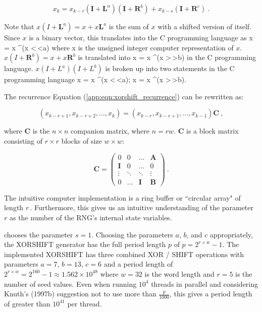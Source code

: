 \documentclass[a4paper]{scrartcl}
\begin{document}
\begin{equation*}
x_{k} = x_{k - r}  (\mathbf{I} + \mathbf{L}^a)(\mathbf{I} + \mathbf{R}^b) + x_{k - s} (\mathbf{I} + \mathbf{R}^c)~.
\end{equation*}

Note that $x(I + \mathbf{L}^a) = x + x \mathbf{L}^a$ is the sum of $x$ with a shifted version of itself.  Since $x$ is a binary vector, this translates into the C programming language as  \textsf{x = x \textasciicircum (x \textless\,\textless a) } where \textsf{x} is the unsigned integer computer representation of $x$. $x(I + \mathbf{R}^b) = x + x \mathbf{R}^b$ is translated into  \textsf{x = x \textasciicircum (x \textgreater\,\textgreater b) } in the C programming language. $x(I + L^a)(I + L^b)$ is broken up into two statements in the C programming language \textsf{x = x \textasciicircum (x \textless\,\textless a); x = x \textasciicircum (x \textgreater\,\textgreater b)}.

The recurrence Equation (\ref{app:eqn:xorshift_recurrence}) can be rewritten as:

\begin{equation*}
(x_{k - r + 1}, x_{k - r + 2}, \dots, x_k) = (x_{k - r}, x_{k - r + 1}, \dots, x_{k - 1}) \mathbf{C}~,
\end{equation*}

where $\mathbf{C}$ is the $n \times n$ companion matrix, where $n = r w$. $\mathbf{C}$ is a block matrix consisting of $r \times r$ blocks of size $w \times w$:

\begin{equation*}
\mathbf{C} = \left( \begin{array}{cccc}
0 & 0 & \dots & \mathbf{A} \\
\mathbf{I} & 0 & \dots & 0 \\
\vdots & \ddots & \ddots & \vdots \\
0 & \dots & \mathbf{I} & \mathbf{B}\end{array} \right)~.
\end{equation*} 

The intuitive computer implementation is a ring buffer or ``circular array" of length $r$\,\citep{Knuth1997b}. Furthermore, this gives us an intuitive understanding of the parameter $r$ as the number of the RNG's internal state variables.

\citet{Marsaglia2003} chooses the parameter $s = 1$. Choosing the parameters $a$, $b$, and $c$ appropriately, the XORSHIFT generator has the full period length $p$ of $p = 2^{r \times w} - 1$. The implemented XORSHIFT has three combined XOR / SHIFT operations with parameters $a = 7$, $b = 13$, $c = 6$ and a period length of $2^{r \times w} = 2^{160} - 1 \approx 1.562 \times 10^{48}$ where $w = 32$ is the word length and $r = 5$ is the number of seed values. Even when running $10^4$ threads in parallel and considering Knuth's (1997b) %
suggestion not to use more than $\frac{p}{1000}$, this gives a period length of greater than $10^{41}$ per thread.
\end{document}
